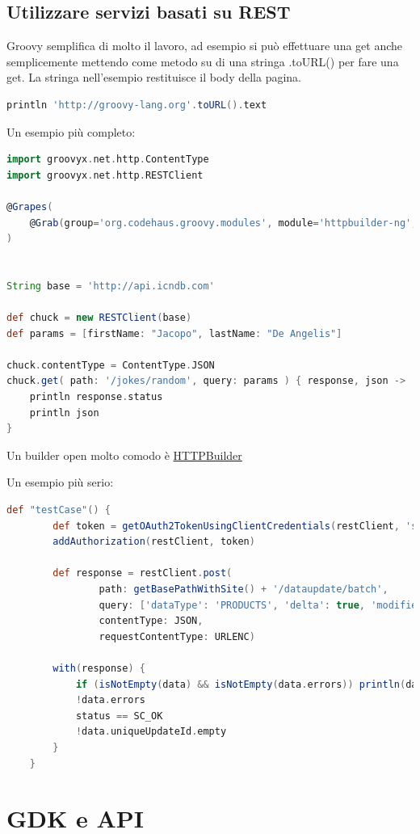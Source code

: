 \documentclass[11pt,a4paper]{book}
\begin{document}
\section{Utilizzare servizi basati su REST}
Groovy semplifica di molto il lavoro, ad esempio si può effettuare una get anche semplicemente mettendo come metodo su di una stringa .toURL() per fare una get. La stringa nell'esempio restituisce il body della pagina.
\begin{lstlisting}[language = groovy]
println 'http://groovy-lang.org'.toURL().text
\end{lstlisting}

Un esempio più completo:
\begin{lstlisting}[language = groovy]
import groovyx.net.http.ContentType
import groovyx.net.http.RESTClient

@Grapes(
    @Grab(group='org.codehaus.groovy.modules', module='httpbuilder-ng', version='0.9.1')
)


String base = 'http://api.icndb.com'

def chuck = new RESTClient(base)
def params = [firstName: "Jacopo", lastName: "De Angelis"]

chuck.contentType = ContentType.JSON
chuck.get( path: '/jokes/random', query: params ) { response, json ->
    println response.status
    println json
}
\end{lstlisting}

Un builder open molto comodo è \href{https://github.com/jgritman/httpbuilder/}{HTTPBuilder}

Un esempio più serio:
\begin{lstlisting}[language = groovy]
def "testCase"() {
        def token = getOAuth2TokenUsingClientCredentials(restClient, 'superup_trusted_client', getClientSecret())
        addAuthorization(restClient, token)

        def response = restClient.post(
                path: getBasePathWithSite() + '/dataupdate/batch',
                query: ['dataType': 'PRODUCTS', 'delta': true, 'modifiedSinceTimestamp': 10000000],
                contentType: JSON,
                requestContentType: URLENC)

        with(response) {
            if (isNotEmpty(data) && isNotEmpty(data.errors)) println(data)
            !data.errors
            status == SC_OK
            !data.uniqueUpdateId.empty
        }
    }
\end{lstlisting}

\chapter{GDK e API}
\end{document}
